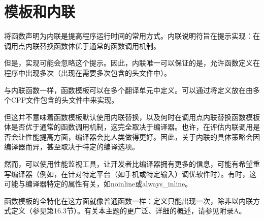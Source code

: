 \section{模板和内联}
将函数声明为内联是提高程序运行时间的常用方式。内联说明符旨在提示实现：在调用点内联替换函数体优于通常的函数调用机制。

但是，实现可能会忽略这个提示。因此，内联唯一可以保证的是，允许函数定义在程序中出现多次（出现在需要多次包含的头文件中）。

与内联函数一样，函数模板可以在多个翻译单元中定义。可以通过将定义放在由多个CPP文件包含的头文件中来实现。

但这并不意味着函数模板默认使用内联替换，以及何时在调用点内联替换函数模板体是否优于通常的函数调用机制，这完全取决于编译器。也许，在评估内联调用是否会让性能提高方面，编译器会比人类做得更好。因此，关于内联的具体策略会因编译器而异，甚至取决于特定的编译选项。

然而，可以使用性能监视工具，让开发者比编译器拥有更多的信息，可能有希望重写编译器（例如，在针对特定平台（如手机或特定输入）调优软件时）。有时，这可能与编译器特定的属性有关，如noinline或always\_inline。

函数模板的全特化在这方面就像普通函数一样：定义只能出现一次，除非以内联方式定义（参见第16.3节）。有关本主题的更广泛、详细的概述，请参见附录A。

























